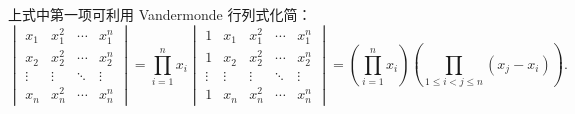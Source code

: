 \documentclass[12pt,fontset=fandol]{ctexart}
\begin{document}
\begin{solve}
            上式中第一项可利用 Vandermonde 行列式化简：
            \[
                \begin{vmatrix}
                    x_1    & x_1^2  & \cdots & x_1^n  \\
                    x_2    & x_2^2  & \cdots & x_2^n  \\
                    \vdots & \vdots & \ddots & \vdots \\
                    x_n    & x_n^2  & \cdots & x_n^n
                \end{vmatrix} = \prod_{i=1}^n x_i \begin{vmatrix}
                    1      & x_1    & x_1^2  & \cdots & x_1^n  \\
                    1      & x_2    & x_2^2  & \cdots & x_2^n  \\
                    \vdots & \vdots & \vdots & \ddots & \vdots \\
                    1      & x_n    & x_n^2  & \cdots & x_n^n
                \end{vmatrix} = \left(\prod_{i=1}^n x_i\right) \left(\prod_{1 \leqslant i < j \leqslant n} (x_j - x_i)\right).
            \]


\end{solve}
\end{document}
